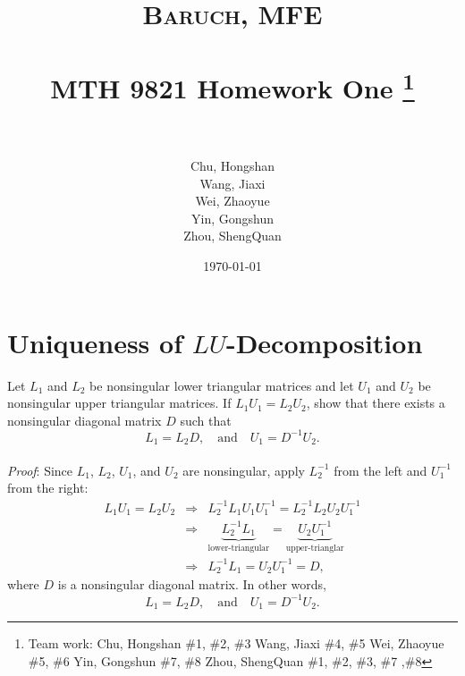 \documentclass[paper=a4, fontsize=11pt]{scrartcl} %
\title{	
\normalfont \normalsize
\textsc{Baruch, MFE} \\ [25pt] %
\horrule{0.5pt} \\[0.4cm] %
\huge MTH 9821 Homework One \footnote{Team work:\newline
Chu, Hongshan \#1, \#2, \#3 \newline 
Wang, Jiaxi \#4, \#5 \newline
Wei, Zhaoyue \#5, \#6 \newline 
Yin, Gongshun \#7, \#8 \newline
Zhou, ShengQuan \#1, \#2, \#3, \#7 ,\#8}\\  %
\horrule{2pt} \\[0.5cm] %
}
\author{Chu, Hongshan\\
Wang, Jiaxi\\
Wei, Zhaoyue\\
Yin, Gongshun\\
Zhou, ShengQuan} %
\date{\normalsize\today} %
\numberwithin{equation}{section} %
\numberwithin{figure}{section} %
\numberwithin{table}{section} %
\begin{document}
	


\maketitle %

\newpage



\section{Uniqueness of $LU$-Decomposition}
Let $L_1$ and $L_2$ be nonsingular lower triangular matrices and let $U_1$ and $U_2$ be nonsingular upper triangular
matrices. If $L_1 U_1 = L_2 U_2$, show that there exists a nonsingular diagonal matrix $D$ such that
$$
L_1 = L_2 D, \quad \text{and} \quad U_1 = D^{-1}U_2.
$$\\
\textit{Proof}: Since $L_1$, $L_2$, $U_1$, and $U_2$ are nonsingular, apply $L_2^{-1}$ from the left and $U_1^{-1}$ from the right:
\begin{eqnarray}
\nonumber L_1 U_1 = L_2 U_2 &\Rightarrow& L_2^{-1} L_1 U_1 U_1^{-1} = L_2^{-1}L_2 U_2 U_1^{-1}\\
\nonumber &\Rightarrow & \underbrace{L_2^{-1} L_1}_{\text{lower-triangular}} = \underbrace{U_2 U_1^{-1}}_{\text{upper-trianglar}} \\
\nonumber &\Rightarrow& L_2^{-1} L_1 = U_2 U_1^{-1} = D,
\end{eqnarray}
where $D$ is a nonsingular diagonal matrix. In other words,
$$
L_1 = L_2 D, \quad \text{and} \quad U_1 = D^{-1}U_2.
$$


\newpage
\end{document}
